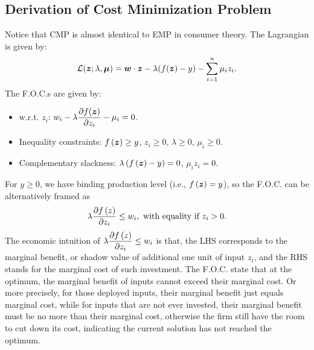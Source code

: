 
\subsection{Derivation of Cost Minimization Problem}


Notice that CMP is almost identical to EMP in consumer theory. The
Lagrangian is given by:
\[\mathcal L(\bm z;\lambda,\boldsymbol \mu) = \bm w\cdot\bm z - \lambda (f(\bm z)-y)-\sum_{i = 1}^n \mu_iz_i.\]
The F.O.C.s are given by:

\begin{itemize}
\item
  w.r.t. \(z_i\):
  \(w_i-\lambda \dfrac{\partial f(\bm z)}{\partial z_i}-\mu_i= 0\).
\item
  Inequality constraints: \(f\left(\bm z\right)\ge y\), \(z_i\ge 0\),
  \(\lambda \ge 0\), \(\mu_i\ge 0\).
\item
  Complementary slackness: \(\lambda\left(f\left(\bm z\right)-y\right) = 0\),
  \(\mu_iz_i = 0\).
\end{itemize}

For \(y\ge 0\), we have binding production level (i.e.,
\(f\left(\bm z\right) = y\)), so the F.O.C. can be alternatively framed as
\[\lambda\frac{\partial f\left(z\right)}{\partial z_i}\le w_i, \text{ with equality if }z_i>0.\]
The economic intuition of
\(\lambda\dfrac{\partial f\left(z\right)}{\partial z_i}\le w_i\) is that, the
LHS corresponds to the marginal benefit, or shadow value of
additional one unit of input \(z_i\), and the RHS stands for the
marginal cost of such investment. The F.O.C. state that at the optimum,
the marginal benefit of inputs cannot exceed their marginal cost. Or
more precisely, for those deployed inputs, their marginal benefit just
equals marginal cost, while for inputs that are not ever invested, their
marginal benefit must be no more than their marginal cost, otherwise the
firm still have the room to cut down its cost, indicating the current solution has not
reached the optimum.

